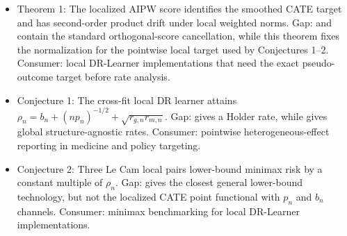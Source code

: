 \documentclass[11pt]{article}
\theoremstyle{definition}
\theoremstyle{plain}
\theoremstyle{remark}
\begin{document}
\begin{itemize}[leftmargin=*]
\item Theorem 1: The localized AIPW score identifies the smoothed CATE target and has second-order product drift under local weighted norms. Gap: \citet{ChernozhukovEtAl2018DML} and \citet{Kennedy2023DRCATE} contain the standard orthogonal-score cancellation, while this theorem fixes the normalization for the pointwise local target used by Conjectures 1--2. Consumer: local DR-Learner implementations that need the exact pseudo-outcome target before rate analysis.
\item Conjecture 1: The cross-fit local DR learner attains $\rho_n=b_n+(n p_n)^{-1/2}+\sqrt{r_{g,n}r_{m,n}}$. Gap: \citet{KennedyBalakrishnanRobinsWasserman2024MinimaxCATE} gives a Holder rate, while \citet{JinSyrgkanis2024StructureAgnosticDR} gives global structure-agnostic rates. Consumer: pointwise heterogeneous-effect reporting in medicine and policy targeting.
\item Conjecture 2: Three Le Cam local pairs lower-bound minimax risk by a constant multiple of $\rho_n$. Gap: \citet{JinSyrgkanis2025GeneralLinearFunctionalLowerBounds} gives the closest general lower-bound technology, but not the localized CATE point functional with $p_n$ and $b_n$ channels. Consumer: minimax benchmarking for local DR-Learner implementations.
\end{itemize}
%
%
%
\end{document}
